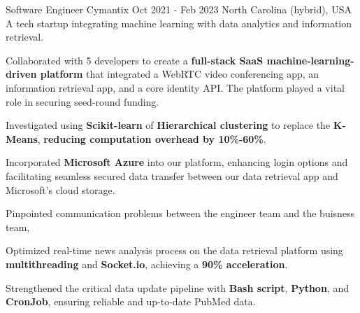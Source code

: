 \begin{cventries}
    \cventry
    {Software Engineer} %
    {Cymantix} %
    {Oct 2021 - Feb 2023} %
    {North Carolina (hybrid), USA} %
    {A tech startup integrating machine learning with data analytics and information retrieval.}
    {
      \begin{cvitems} %
        \item {Collaborated with 5 developers to create a \textbf{full-stack SaaS machine-learning-driven platform} that integrated a WebRTC video conferencing app, an information retrieval app, and a core identity API. The platform played a vital role in securing seed-round funding.}
        \item {Investigated using \textbf{Scikit-learn} of \textbf{Hierarchical clustering} to replace the \textbf{K-Means}, \textbf{reducing computation overhead by 10\%-60\%}.}
        \item {Incorporated \textbf{Microsoft Azure} into our platform, enhancing login options and facilitating seamless secured data transfer between our data retrieval app and Microsoft's cloud storage.}
        \item {Pinpointed communication problems between the engineer team and the buisness team, }
        \item {Optimized real-time news analysis process on the data retrieval platform using \textbf{multithreading} and \textbf{Socket.io}, achieving a \textbf{90\% acceleration}.}
        \item {Strengthened the critical data update pipeline with \textbf{Bash script}, \textbf{Python}, and \textbf{CronJob}, ensuring reliable and up-to-date PubMed data.}
      \end{cvitems}
    }


\end{cventries}
